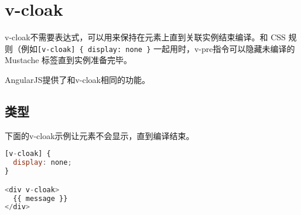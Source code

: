 \begin{lstlisting}[language=JavaScript]

\end{lstlisting}




\begin{lstlisting}[language=JavaScript]

\end{lstlisting}

\chapter{v-cloak}

v-cloak不需要表达式，可以用来保持在元素上直到关联实例结束编译。和 CSS 规则（例如\texttt{[v-cloak] \{ display: none \}} 一起用时，v-pre指令可以隐藏未编译的 Mustache 标签直到实例准备完毕。

AngularJS提供了和v-cloak相同的功能。

\section{类型}

下面的v-cloak示例让元素不会显示，直到编译结束。

\begin{lstlisting}[language=JavaScript]
[v-cloak] {
  display: none;
}

<div v-cloak>
  {{ message }}
</div>
\end{lstlisting}



\begin{lstlisting}[language=JavaScript]

\end{lstlisting}




\begin{lstlisting}[language=JavaScript]

\end{lstlisting}




\begin{lstlisting}[language=JavaScript]

\end{lstlisting}




\begin{lstlisting}[language=JavaScript]

\end{lstlisting}




